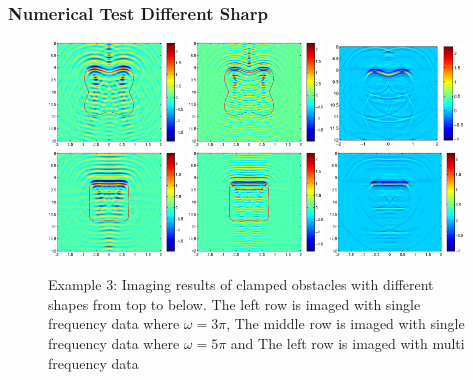 \documentclass[cjk,8pt]{beamer}
\newcommand{\om}{\omega}
\begin{document}
\begin{CJK*}{GBK}{kai}
\begin{frame}
\frametitle{Numerical Test Different Sharp}
\begin{figure}[h]
    \centering
	\includegraphics[width=0.32\textwidth]{./graphic/p_leaf_3pi.eps}
	\includegraphics[width=0.32\textwidth]{./graphic/p_leaf_5pi.eps}
	\includegraphics[width=0.32\textwidth]{./graphic/p_leaf.eps}\\
	\includegraphics[width=0.32\textwidth]{./graphic/rectangle_3pi.eps}
	\includegraphics[width=0.32\textwidth]{./graphic/rectangle_5pi.eps}
	\includegraphics[width=0.32\textwidth]{./graphic/rectangle.eps}
\caption{Example 3: Imaging results of clamped obstacles
		with different shapes from top to below. The left row is imaged with single frequency data where $\om=3\pi$, The middle row is imaged with single frequency data where $\om=5\pi$ and The left row is imaged with multi frequency data}
\end{figure}
\end{frame}



\end{CJK*}
\end{document}
